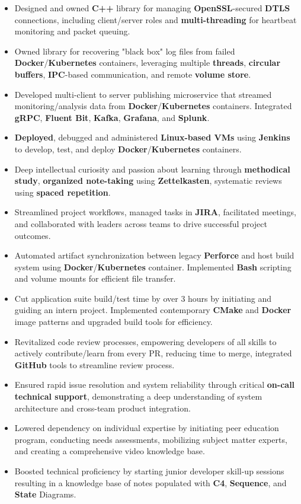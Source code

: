 \documentclass[a4paper]{article}
\begin{document}
\begin{itemize}
	\item Designed and owned \textbf{C++} library for managing \textbf{OpenSSL}-secured \textbf{DTLS} connections, including client/server roles and \textbf{multi-threading} for heartbeat monitoring and packet queuing.
	\item Owned library for recovering "black box" log files from failed \textbf{Docker}/\textbf{Kubernetes} containers, leveraging multiple \textbf{threads}, \textbf{circular buffers}, \textbf{IPC}-based communication, and remote \textbf{volume store}.
	\item Developed multi-client to server publishing microservice that streamed monitoring/analysis data from \textbf{Docker}/\textbf{Kubernetes} containers. Integrated \textbf{gRPC}, \textbf{Fluent Bit}, \textbf{Kafka}, \textbf{Grafana}, and \textbf{Splunk}.
	\item \textbf{Deployed}, debugged and administered \textbf{Linux-based VMs} using \textbf{Jenkins} to develop, test, and deploy \textbf{Docker}/\textbf{Kubernetes} containers.
	\item Deep intellectual curiosity and passion about learning through \textbf{methodical study}, \textbf{organized note-taking} using \textbf{Zettelkasten}, systematic reviews using \textbf{spaced repetition}.
	\item Streamlined project workflows, managed tasks in \textbf{JIRA}, facilitated meetings, and collaborated with leaders across teams to drive successful project outcomes.
	\item Automated artifact synchronization between legacy \textbf{Perforce} and host build system using \textbf{Docker}/\textbf{Kubernetes} container. Implemented \textbf{Bash} scripting and volume mounts for efficient file transfer.
	\item Cut application suite build/test time by over 3 hours by initiating and guiding an intern project. Implemented contemporary \textbf{CMake} and \textbf{Docker} image patterns and upgraded build tools for efficiency.
	\item Revitalized code review processes, empowering developers of all skills to actively contribute/learn from every PR, reducing time to merge, integrated \textbf{GitHub} tools to streamline review process.
	\item Ensured rapid issue resolution and system reliability through critical \textbf{on-call technical support}, demonstrating a deep understanding of system architecture and cross-team product integration.
	\item Lowered dependency on individual expertise by initiating peer education program, conducting needs assessments, mobilizing subject matter experts, and creating a comprehensive video knowledge base.
	\item Boosted technical proficiency by starting junior developer skill-up sessions resulting in a knowledge base of notes populated with \textbf{C4}, \textbf{Sequence}, and \textbf{State} Diagrams.
\end{itemize}
\end{document}
